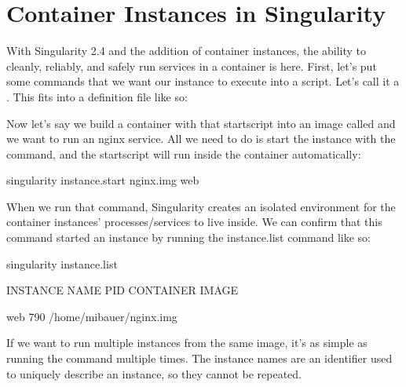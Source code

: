 \documentclass[letterpaper,10pt,english]{sphinxmanual}
\begin{document}
\section{Container Instances in Singularity}
\label{\detokenize{running_services:container-instances-in-singularity}}
With Singularity 2.4 and the addition of container instances, the
ability to cleanly, reliably, and safely run services in a container is
here. First, let’s put some commands that we want our instance to
execute into a script. Let’s call it a . This fits into a definition
file like so:

%
\begin{sphinxVerbatim}[commandchars=\\\{\}]


  
\end{sphinxVerbatim}

Now let’s say we build a container with that startscript into an image
called  and we want to run an nginx service. All we need to do is start
the instance with the  command, and the
startscript will run inside the container automatically:

%
\begin{sphinxVerbatim}

\PYGZdl{} singularity instance.start   nginx.img  web
\end{sphinxVerbatim}

When we run that command, Singularity creates an isolated environment
for the container instances’ processes/services to live inside. We can
confirm that this command started an instance by running the
instance.list command like so:

%
\begin{sphinxVerbatim}[commandchars=\\\{\}]
\PYGZdl{} singularity instance.list

INSTANCE NAME    PID      CONTAINER IMAGE

web              790      /home/mibauer/nginx.img
\end{sphinxVerbatim}

If we want to run multiple instances from the same image, it’s as simple
as running the command multiple times. The instance names are an
identifier used to uniquely describe an instance, so they cannot be
repeated.
\end{document}
